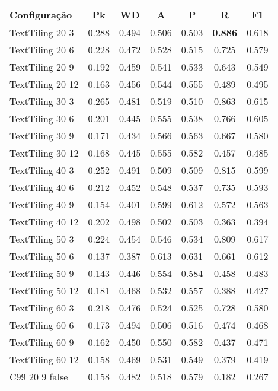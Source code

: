 \documentclass{article}
\begin{document}
 
\begin{tabular}{|l|c|c|c|c|c|c|} 
\hline 
Configuração & \textbf{Pk} & \textbf{WD} & \textbf{A } & \textbf{P } & \textbf{R } & \textbf{F1}\\ \hline
TextTiling 20  3 & 0.288 & 0.494 & 0.506 & 0.503 & \textbf{0.886} & 0.618\\ \hline
TextTiling 20  6 & 0.228 & 0.472 & 0.528 & 0.515 & 0.725 & 0.579\\ \hline
TextTiling 20  9 & 0.192 & 0.459 & 0.541 & 0.533 & 0.643 & 0.549\\ \hline
TextTiling 20 12 & 0.163 & 0.456 & 0.544 & 0.555 & 0.489 & 0.495\\ \hline
TextTiling 30  3 & 0.265 & 0.481 & 0.519 & 0.510 & 0.863 & 0.615\\ \hline
TextTiling 30  6 & 0.201 & 0.445 & 0.555 & 0.538 & 0.766 & 0.605\\ \hline
TextTiling 30  9 & 0.171 & 0.434 & 0.566 & 0.563 & 0.667 & 0.580\\ \hline
TextTiling 30 12 & 0.168 & 0.445 & 0.555 & 0.582 & 0.457 & 0.485\\ \hline
TextTiling 40  3 & 0.252 & 0.491 & 0.509 & 0.509 & 0.815 & 0.599\\ \hline
TextTiling 40  6 & 0.212 & 0.452 & 0.548 & 0.537 & 0.735 & 0.593\\ \hline
TextTiling 40  9 & 0.154 & 0.401 & 0.599 & 0.612 & 0.572 & 0.563\\ \hline
TextTiling 40 12 & 0.202 & 0.498 & 0.502 & 0.503 & 0.363 & 0.394\\ \hline
TextTiling 50  3 & 0.224 & 0.454 & 0.546 & 0.534 & 0.809 & 0.617\\ \hline
TextTiling 50  6 & 0.137 & 0.387 & 0.613 & 0.631 & 0.661 & 0.612\\ \hline
TextTiling 50  9 & 0.143 & 0.446 & 0.554 & 0.584 & 0.458 & 0.483\\ \hline
TextTiling 50 12 & 0.181 & 0.468 & 0.532 & 0.557 & 0.388 & 0.427\\ \hline
TextTiling 60  3 & 0.218 & 0.476 & 0.524 & 0.525 & 0.728 & 0.580\\ \hline
TextTiling 60  6 & 0.173 & 0.494 & 0.506 & 0.516 & 0.474 & 0.468\\ \hline
TextTiling 60  9 & 0.162 & 0.450 & 0.550 & 0.582 & 0.437 & 0.471\\ \hline
TextTiling 60 12 & 0.158 & 0.469 & 0.531 & 0.549 & 0.379 & 0.419\\ \hline
C99 20  9 false & 0.158 & 0.482 & 0.518 & 0.579 & 0.182 & 0.267\\ \hline

\end{tabular}
\end{document}
